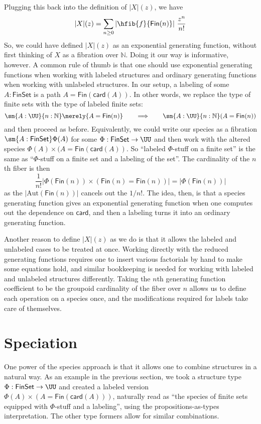 \documentclass[fleqn]{article}
\newcommand{\card}{\mathsf{card}}
\newcommand{\gf}[1]{\abs{#1}\!(z)}
\newcommand{\fin}{\mathsf{Fin}}
\newcommand{\finset}{\mathsf{FinSet}}
\newcommand{\abs}[1]{\left\lvert #1 \right\rvert}
\newcommand{\Aut}{\mathrm{Aut}}
\theoremstyle{theorem}
\theoremstyle{definition}
\begin{document}
Plugging this back into the definition of $\gf{X}$, we have
\[
  \gf{X} = \sum_{n\geq0} \abs{\hfib{f}{\fin(n)}}\, \frac{z^{n}}{n!}
\]
So, we could have defined $\gf{X}$ as an exponential generating function,
without first thinking of $X$ as a fibration over $\mathbb{N}$.  Doing it our
way is informative, however.  A common rule of thumb is that one should use
exponential generating functions when working with labeled structures and
ordinary generating functions when working with unlabeled structures.  In
our setup, a labeling of some $A : \finset$ is a path $A = \fin(\card(A))$.  In
other words, we replace the type of finite sets with the type of labeled finite
sets:
\[
  \sm{A : \UU}{n: \mathbb{N}} \merely{A = \fin(n)}
  \qquad\Longrightarrow\qquad
  \sm{A : \UU}{n : \mathbb{N}} (A = \fin(n))
\]
and then proceed as before.  Equivalently, we could write our species as a
fibration $\sm{A:\finset}\Phi(A)$ for some $\Phi : \finset \to \UU$ and then
work with the altered species $\Phi(A) \times (A = \fin(\card(A))$.  So
``labeled $\Phi$-stuff on a finite set'' is the same as ``$\Phi$-stuff on a
finite set and a labeling of the set''.  The cardinality of the $n$th fiber is
then
\[
  \frac{1}{n!}
  \abs{
    \Phi(\fin(n)) \times (\fin(n) = \fin(n))
  }
  =
  \abs{\Phi(\fin(n))}
\]
as the $\abs{\Aut(\fin(n))}$ cancels out the $1/n!$.  The idea, then, is that a
species generating function gives an exponential generating function when one
computes out the dependence on $\card$, and then a labeling turns it into an
ordinary generating function.

Another reason to define $\gf{X}$ as we do is that it allows the labeled and
unlabeled cases to be treated at once.  Working directly with the reduced
generating functions requires one to insert various factorials by hand to make
some equations hold, and similar bookkeeping is needed for working with labeled
and unlabeled structures differently.  Taking the $n$th generating function
coefficient to be the groupoid cardinality of the fiber over $n$ allows us to
define each operation on a species once, and the modifications required for
labels take care of themselves.


\section{Speciation}

One power of the species approach is that it allows one to combine structures
in a natural way.  As an example in the previous section, we took a structure
type $\Phi : \finset \to \UU$ and created a labeled version $\Phi(A) \times (A
= \fin(\card(A)))$, naturally read as ``the species of finite sets equipped
with $\Phi$-stuff and a labeling'', using the propositions-as-types
interpretation.  The other type formers allow for similar combinations.
\end{document}
